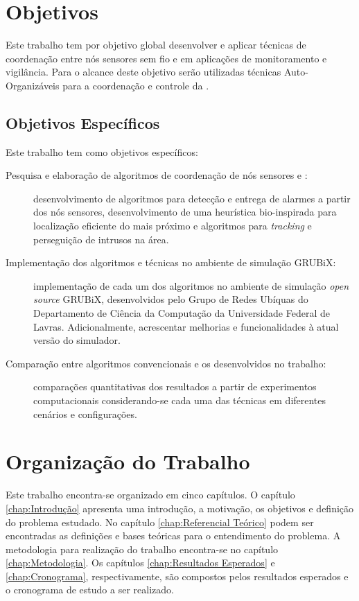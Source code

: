 \section{Objetivos}

Este trabalho tem por objetivo global desenvolver e aplicar técnicas de
coordenação entre nós sensores sem fio e \uavs em aplicações de monitoramento
e vigilância. Para o alcance deste objetivo serão utilizadas técnicas
Auto-Organizáveis para a coordenação e controle da \rssf.

\subsection{Objetivos Específicos}

Este trabalho tem como objetivos específicos:

\begin{description}

	\item [Pesquisa e elaboração de algoritmos de coordenação de nós
sensores e \vants:] desenvolvimento de algoritmos para detecção e entrega de
alarmes a partir dos nós sensores, desenvolvimento de uma heurística
bio-inspirada para localização eficiente do \uav mais próximo e algoritmos para
\emph{tracking} e perseguição de intrusos na área.

	\item [Implementação dos algoritmos e técnicas no ambiente de simulação
GRUBiX:] implementação de cada um dos algoritmos no ambiente de simulação
\emph{open source} GRUBiX, desenvolvidos pelo Grupo de Redes Ubíquas do
Departamento de Ciência da Computação da Universidade Federal de Lavras.
Adicionalmente, acrescentar melhorias e funcionalidades à atual versão do
simulador.

	\item [Comparação entre algoritmos convencionais e os desenvolvidos no
trabalho:] comparações quantitativas dos resultados a partir de experimentos
computacionais considerando-se cada uma das técnicas em diferentes cenários e
configurações.

\end{description}

%
\section{Organização do Trabalho}

Este trabalho encontra-se organizado em cinco capítulos. O capítulo
\ref{chap:Introdução} apresenta uma introdução, a motivação, os objetivos e
definição do problema estudado. No capítulo \ref{chap:Referencial Teórico} podem
ser encontradas as definições e bases teóricas para o entendimento do problema.
A metodologia para realização do trabalho encontra-se no capítulo
\ref{chap:Metodologia}. Os capítulos \ref{chap:Resultados Esperados} e
\ref{chap:Cronograma}, respectivamente, são compostos pelos resultados esperados
e o cronograma de estudo a ser realizado.


